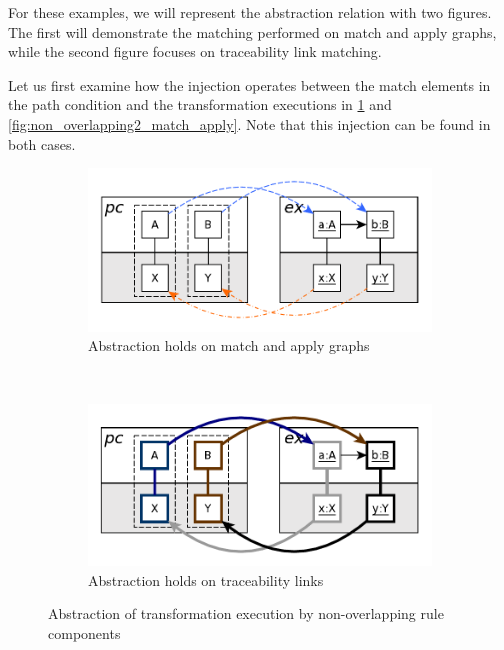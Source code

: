 For these examples, we will represent the abstraction relation with two figures. The first will demonstrate the matching performed on match and apply graphs, while the second figure focuses on traceability link matching.

Let us first examine how the injection operates between the match elements in the path condition and the transformation executions in \cref{fig:non_overlapping_match_apply} and \cref{fig:non_overlapping2_match_apply}. Note that this injection can be found in both cases.

\begin{figure}[htb]
        \centering
        \begin{subfigure}[b]{0.40\textwidth}
                \centering
                \includegraphics[width=1\textwidth]{./figures/abstraction_relation/non_overlapping.pdf}
               	\caption{Abstraction holds on match and apply graphs}
               	\label{fig:non_overlapping_match_apply}
        \end{subfigure}%
        ~~\\
        \begin{subfigure}[b]{0.40\textwidth}
                \centering
                \includegraphics[width=1\textwidth]{./figures/abstraction_relation/non_overlapping_trace_links.pdf}
                \caption{Abstraction holds on traceability links}
                \label{fig:non_overlapping_trace_links}
        \end{subfigure}%
        \caption{Abstraction of transformation execution by non-overlapping rule components}
        \label{fig:non_overlapping}
\end{figure}



